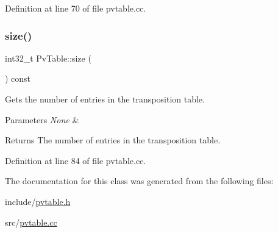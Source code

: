 Definition at line 70 of file pvtable.\+cc.

\mbox{\label{classPvTable_a6df38f01a626250eb8d1878d1fbb0029}} 
\subsubsection{\texorpdfstring{size()}{size()}}
{\footnotesize\ttfamily int32\+\_\+t Pv\+Table\+::size (\begin{DoxyParamCaption}{ }\end{DoxyParamCaption}) const\hspace{0.3cm}{\ttfamily [noexcept]}}



Gets the number of entries in the transposition table. 


\begin{DoxyParams}{Parameters}
{\em None} & \\
\hline
\end{DoxyParams}
\begin{DoxyReturn}{Returns}
The number of entries in the transposition table. 
\end{DoxyReturn}


Definition at line 84 of file pvtable.\+cc.



The documentation for this class was generated from the following files\+:\begin{DoxyCompactItemize}
\item 
include/\mbox{\hyperlink{pvtable_8h}{pvtable.\+h}}\item 
src/\mbox{\hyperlink{pvtable_8cc}{pvtable.\+cc}}\end{DoxyCompactItemize}
